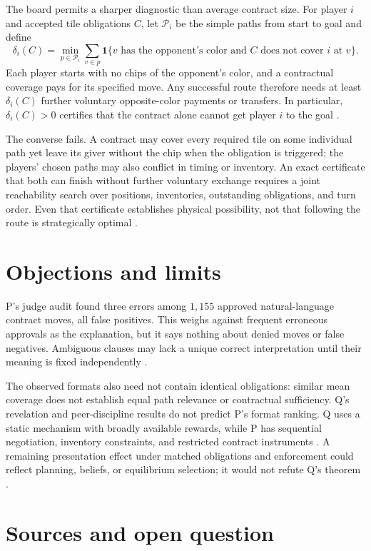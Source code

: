 \documentclass{article}
\begin{document}
The board permits a sharper diagnostic than average contract size. For player \(i\) and accepted tile obligations \(C\), let \(\mathcal P_i\) be the simple paths from start to goal and define
\[
\delta_i(C)
=
\min_{p\in\mathcal P_i}
\sum_{v\in p}
\mathbf 1\{\text{\(v\) has the opponent's color and \(C\) does not cover \(i\) at \(v\)}\}.
\]
Each player starts with no chips of the opponent's color, and a contractual coverage pays for its specified move. Any successful route therefore needs at least \(\delta_i(C)\) further voluntary opposite-color payments or transfers. In particular, \(\delta_i(C)>0\) certifies that the contract alone cannot get player \(i\) to the goal .

The converse fails. A contract may cover every required tile on some individual path yet leave its giver without the chip when the obligation is triggered; the players' chosen paths may also conflict in timing or inventory. An exact certificate that both can finish without further voluntary exchange requires a joint reachability search over positions, inventories, outstanding obligations, and turn order. Even that certificate establishes physical possibility, not that following the route is strategically optimal .

\section*{Objections and limits}

P's judge audit found three errors among \(1{,}155\) approved natural-language contract moves, all false positives. This weighs against frequent erroneous approvals as the explanation, but it says nothing about denied moves or false negatives. Ambiguous clauses may lack a unique correct interpretation until their meaning is fixed independently .

The observed formats also need not contain identical obligations: similar mean coverage does not establish equal path relevance or contractual sufficiency. Q's revelation and peer-discipline results do not predict P's format ranking. Q uses a static mechanism with broadly available rewards, while P has sequential negotiation, inventory constraints, and restricted contract instruments . A remaining presentation effect under matched obligations and enforcement could reflect planning, beliefs, or equilibrium selection; it would not refute Q's theorem .

\section*{Sources and open question}
\end{document}
